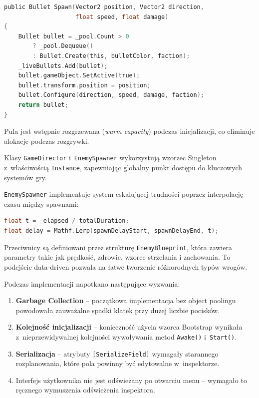 \begin{lstlisting}[language=C, caption={Fragment implementacji object poolingu w Unity}, label={lst:unity-pool}]
public Bullet Spawn(Vector2 position, Vector2 direction, 
                    float speed, float damage)
{
    Bullet bullet = _pool.Count > 0 
        ? _pool.Dequeue() 
        : Bullet.Create(this, bulletColor, faction);
    _liveBullets.Add(bullet);
    bullet.gameObject.SetActive(true);
    bullet.transform.position = position;
    bullet.Configure(direction, speed, damage, faction);
    return bullet;
}
\end{lstlisting}

Pula jest wstępnie rozgrzewana (\textit{warm capacity}) podczas inicjalizacji, co eliminuje alokacje podczas rozgrywki.

Klasy \texttt{GameDirector} i~\texttt{EnemySpawner} wykorzystują wzorzec Singleton z~właściwością \texttt{Instance}, 
zapewniając globalny punkt dostępu do kluczowych systemów gry.


\texttt{EnemySpawner} implementuje system eskalującej trudności poprzez interpolację czasu między spawnami:

\begin{lstlisting}[language=C, caption={Interpolacja trudności w Unity}, label={lst:unity-difficulty}]
float t = _elapsed / totalDuration;
float delay = Mathf.Lerp(spawnDelayStart, spawnDelayEnd, t);
\end{lstlisting}

Przeciwnicy są definiowani przez strukturę \texttt{EnemyBlueprint}, która zawiera parametry takie jak prędkość, zdrowie, wzorce strzelania i zachowania. To podejście data-driven pozwala na łatwe tworzenie różnorodnych typów wrogów.


Podczas implementacji napotkano następujące wyzwania:

\begin{enumerate}
    \item \textbf{Garbage Collection} -- początkowa implementacja bez object poolingu powodowała zauważalne spadki klatek przy dużej liczbie pocisków.
    \item \textbf{Kolejność inicjalizacji} -- konieczność użycia wzorca Bootstrap wynikała z~nieprzewidywalnej kolejności wywoływania metod \texttt{Awake()} i~\texttt{Start()}.
    \item \textbf{Serializacja} -- atrybuty \texttt{[SerializeField]} wymagały starannego rozplanowania, które pola powinny być edytowalne w~inspektorze.
    \item Interfejs użytkownika nie jest odświeżany po otwarciu menu \cite{linux_editor_does_not_redraw} -- wymagało to ręcznego wymuszenia odświeżenia inspektora.
\end{enumerate}


